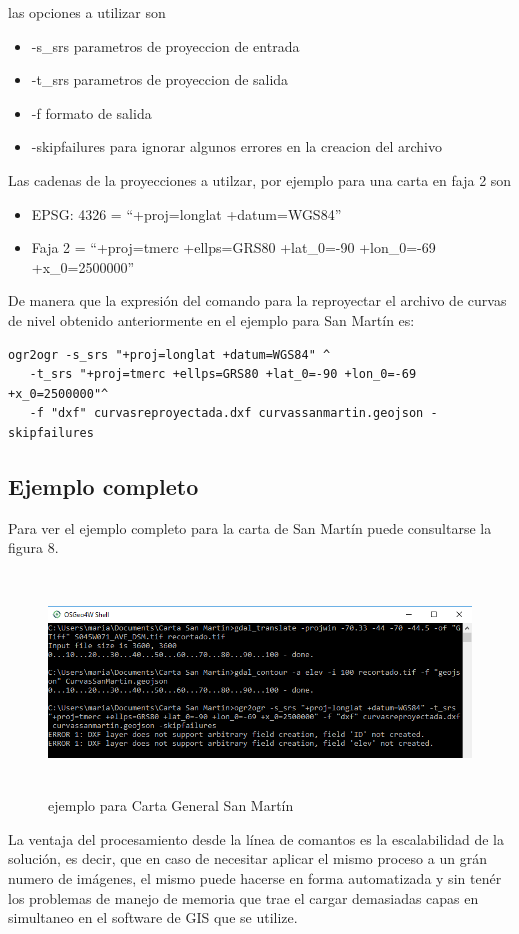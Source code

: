 \documentclass[12pt,]{extarticle}
\begin{document}
las opciones a utilizar son

\begin{itemize}
\item
  -s\_srs parametros de proyeccion de entrada
\item
  -t\_srs parametros de proyeccion de salida
\item
  -f formato de salida
\item
  -skipfailures para ignorar algunos errores en la creacion del archivo
\end{itemize}

Las cadenas de la proyecciones a utilzar, por ejemplo para una carta en
faja 2 son

\begin{itemize}
\item
  EPSG: 4326 = ``+proj=longlat +datum=WGS84''
\item
  Faja 2 = ``+proj=tmerc +ellps=GRS80 +lat\_0=-90 +lon\_0=-69
  +x\_0=2500000''
\end{itemize}

De manera que la expresión del comando para la reproyectar el archivo de
curvas de nivel obtenido anteriormente en el ejemplo para San Martín es:

\begin{verbatim}
ogr2ogr -s_srs "+proj=longlat +datum=WGS84" ^
   -t_srs "+proj=tmerc +ellps=GRS80 +lat_0=-90 +lon_0=-69 +x_0=2500000"^
   -f "dxf" curvasreproyectada.dxf curvassanmartin.geojson -skipfailures
\end{verbatim}

\hypertarget{ejemplo-completo}{%
\subsection{Ejemplo completo}\label{ejemplo-completo}}

Para ver el ejemplo completo para la carta de San Martín puede
consultarse la figura 8.

\begin{figure}
\centering
\includegraphics[width=6.38777in,height=2.288in]{../img/image13.png}
\caption{ejemplo para Carta General San Martín}
\end{figure}

La ventaja del procesamiento desde la línea de comantos es la
escalabilidad de la solución, es decir, que en caso de necesitar aplicar
el mismo proceso a un grán numero de imágenes, el mismo puede hacerse en
forma automatizada y sin tenér los problemas de manejo de memoria que
trae el cargar demasiadas capas en simultaneo en el software de GIS que
se utilize.
\end{document}
